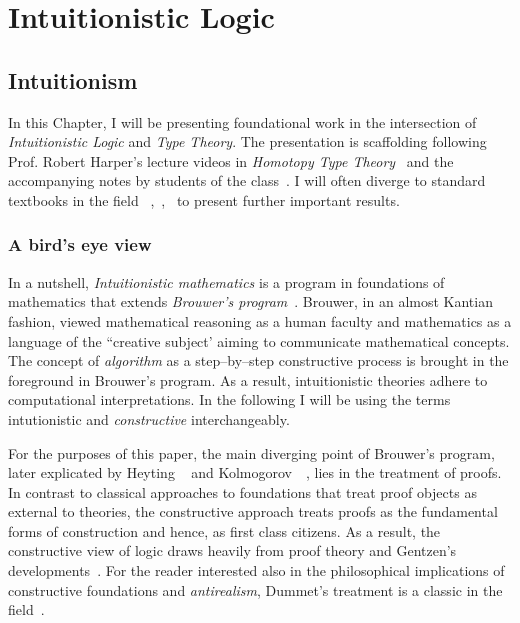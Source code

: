 \chapter{Intuitionistic Logic}\label{intui}
\section{Intuitionism}\label{sec:intrui}
In this Chapter, I will be presenting foundational work in the intersection of \emph{Intuitionistic Logic} and \emph{Type Theory}. The presentation is scaffolding following Prof. Robert Harper's lecture videos in \emph{Homotopy Type Theory}~\cite{HarperHOTT} and the accompanying notes by students of the class~\cite{HOTTNotes1}. I will often diverge to standard textbooks in the field ~\cite{Barendregt1984-BARTLC},~\cite{girard1989proofs},~\cite{Pierce:2002:TPL:509043} to present further important results. 
\subsection{A bird's eye view}  
In a nutshell, \emph{Intuitionistic mathematics}  is a program in foundations of mathematics  that extends \emph{Brouwer's program}~\cite{brouwer1975collected}.
Brouwer, in an almost Kantian fashion, viewed mathematical reasoning as a human faculty and mathematics as a language of the ``creative subject'
aiming to communicate mathematical concepts. The concept of \emph{algorithm} as a step--by--step constructive process is brought in the foreground in Brouwer's program. As a result, intuitionistic theories adhere to computational interpretations. In the following I will be using the terms intutionistic and \emph{constructive} interchangeably.  

 For the purposes of this paper, the main diverging point of Brouwer's program, later explicated by Heyting ~\cite{heyting1966intuitionism} and Kolmogorov~\cite{kolmogorov1925principe}~\cite{artemov2004kolmogorov}, lies in the treatment of proofs. In contrast to classical approaches to foundations that treat proof objects as external to theories, the constructive approach treats proofs as the
 fundamental forms of construction and hence, as first class citizens. As a result, the constructive view of logic draws heavily from proof theory and Gentzen's developments~\cite{gentzen1970collected}. For the reader interested also in the philosophical implications  of constructive foundations and \emph{antirealism}, Dummet's treatment is a classic in the field~\cite{dummett2000elements}.    
 


